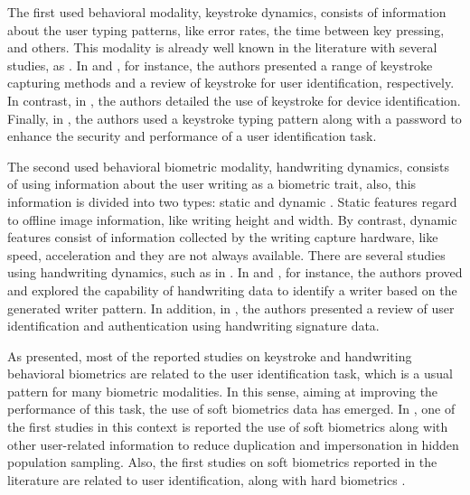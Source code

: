 \documentclass[conference]{IEEEtran}
\begin{document}
The first used behavioral modality, keystroke dynamics, consists of information about the user typing patterns, like error rates, the time between key pressing, and others. This modality is already well known in the literature with several studies, as \cite{ks-methods,ks-review-ident,ks-id-device,ks-hardenning}. In \cite{ks-methods} and \cite{ks-review-ident}, for instance, the authors presented a range of keystroke capturing methods and a review of keystroke for user identification, respectively. In contrast, in \cite{ks-id-device}, the authors detailed the use of keystroke for device identification. Finally, in \cite{ks-hardenning}, the authors used a keystroke typing pattern along with a password to enhance the security and performance of a user identification task.

The second used behavioral biometric modality, handwriting dynamics, consists of using information about the user writing as a biometric trait, also, this information is divided into two types: static and dynamic \cite{hw-recognition}. Static features regard to offline image information, like writing height and width. By contrast, dynamic features consist of information collected by the writing capture hardware, like speed, acceleration and they are not always available. 
There are several studies using handwriting dynamics, such as in \cite{hw-individuality,hw-writer-id,hw-recognition}. In \cite{hw-individuality} and \cite{hw-writer-id}, for instance, the authors proved and explored the capability of handwriting data to identify a writer based on the generated writer pattern. In addition, in \cite{hw-recognition}, the authors presented a review of user identification and authentication using handwriting signature data.

As presented, most of the reported studies on keystroke and handwriting behavioral biometrics are related to the user identification task, which is a usual pattern for many biometric modalities. 
In this sense, aiming at improving the performance of this task, the use of soft biometrics data has emerged. In \cite{first-study}, one of the first studies in this context is reported the use of soft biometrics along with other user-related information to reduce duplication and impersonation in hidden population sampling. Also, the first studies on soft biometrics reported in the literature are related to user identification, along with hard biometrics \cite{jain-assist, jain-personal-recog, jain-integrating}.
\end{document}
